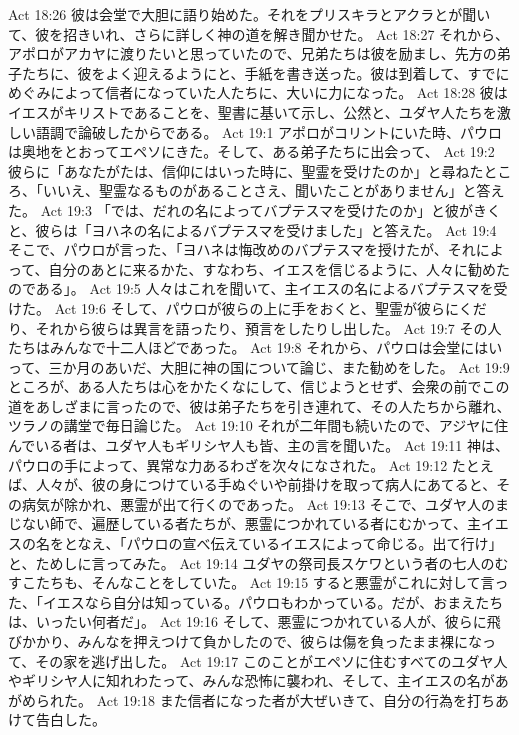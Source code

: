 Act 18:26  彼は会堂で大胆に語り始めた。それをプリスキラとアクラとが聞いて、彼を招きいれ、さらに詳しく神の道を解き聞かせた。
Act 18:27  それから、アポロがアカヤに渡りたいと思っていたので、兄弟たちは彼を励まし、先方の弟子たちに、彼をよく迎えるようにと、手紙を書き送った。彼は到着して、すでにめぐみによって信者になっていた人たちに、大いに力になった。
Act 18:28  彼はイエスがキリストであることを、聖書に基いて示し、公然と、ユダヤ人たちを激しい語調で論破したからである。
Act 19:1  アポロがコリントにいた時、パウロは奥地をとおってエペソにきた。そして、ある弟子たちに出会って、
Act 19:2  彼らに「あなたがたは、信仰にはいった時に、聖霊を受けたのか」と尋ねたところ、「いいえ、聖霊なるものがあることさえ、聞いたことがありません」と答えた。
Act 19:3  「では、だれの名によってバプテスマを受けたのか」と彼がきくと、彼らは「ヨハネの名によるバプテスマを受けました」と答えた。
Act 19:4  そこで、パウロが言った、「ヨハネは悔改めのバプテスマを授けたが、それによって、自分のあとに来るかた、すなわち、イエスを信じるように、人々に勧めたのである」。
Act 19:5  人々はこれを聞いて、主イエスの名によるバプテスマを受けた。
Act 19:6  そして、パウロが彼らの上に手をおくと、聖霊が彼らにくだり、それから彼らは異言を語ったり、預言をしたりし出した。
Act 19:7  その人たちはみんなで十二人ほどであった。
Act 19:8  それから、パウロは会堂にはいって、三か月のあいだ、大胆に神の国について論じ、また勧めをした。
Act 19:9  ところが、ある人たちは心をかたくなにして、信じようとせず、会衆の前でこの道をあしざまに言ったので、彼は弟子たちを引き連れて、その人たちから離れ、ツラノの講堂で毎日論じた。
Act 19:10  それが二年間も続いたので、アジヤに住んでいる者は、ユダヤ人もギリシヤ人も皆、主の言を聞いた。
Act 19:11  神は、パウロの手によって、異常な力あるわざを次々になされた。
Act 19:12  たとえば、人々が、彼の身につけている手ぬぐいや前掛けを取って病人にあてると、その病気が除かれ、悪霊が出て行くのであった。
Act 19:13  そこで、ユダヤ人のまじない師で、遍歴している者たちが、悪霊につかれている者にむかって、主イエスの名をとなえ、「パウロの宣べ伝えているイエスによって命じる。出て行け」と、ためしに言ってみた。
Act 19:14  ユダヤの祭司長スケワという者の七人のむすこたちも、そんなことをしていた。
Act 19:15  すると悪霊がこれに対して言った、「イエスなら自分は知っている。パウロもわかっている。だが、おまえたちは、いったい何者だ」。
Act 19:16  そして、悪霊につかれている人が、彼らに飛びかかり、みんなを押えつけて負かしたので、彼らは傷を負ったまま裸になって、その家を逃げ出した。
Act 19:17  このことがエペソに住むすべてのユダヤ人やギリシヤ人に知れわたって、みんな恐怖に襲われ、そして、主イエスの名があがめられた。
Act 19:18  また信者になった者が大ぜいきて、自分の行為を打ちあけて告白した。
